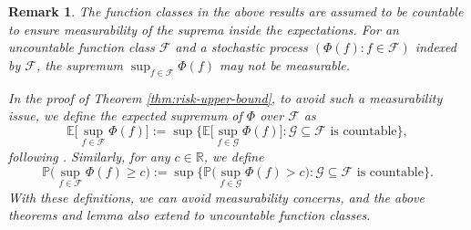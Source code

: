 \documentclass[10pt]{article}
\newtheorem{remark}{Remark}
\newcommand{\E}{{\mathbb E}}
\newcommand{\F}{{\mathcal{F}}}
\newcommand{\G}{{\mathcal{G}}}
\newcommand{\R}{{\mathbb R}}
\renewcommand{\P}{{\mathbb P}}
\begin{document}
\begin{remark}\label{rmk:measurability}
    The function classes in the above results are assumed to be countable 
    to ensure measurability of the suprema inside the expectations. For an 
    uncountable function class $\F$ and a stochastic process 
    $(\Phi(f): f \in \F)$ indexed by $\F$, the supremum 
    $\sup_{f \in \F} \Phi(f)$ may not be measurable.
    
    In the proof of Theorem \ref{thm:risk-upper-bound}, to avoid such a
    measurability issue, we define the expected supremum of 
    $\Phi$ over $\F$ as 
    \begin{equation*}
        \E\Big[\sup_{f \in \F} \Phi(f)\Big] 
        := \sup \Big\{\E\Big[\sup_{f \in \G} \Phi(f)\Big]: 
        \G \subseteq \F \text{ is countable} \Big\},
    \end{equation*}
    following \citet{talagrand2022upper}.
    Similarly, for any $c \in \R$, we define 
    \begin{equation*}
        \P\Big(\sup_{f \in \F} \Phi(f) \ge c\Big) 
        := \sup \Big\{\P\Big(\sup_{f \in \G} \Phi(f) > c\Big): 
        \G \subseteq \F \text{ is countable} \Big\}.
    \end{equation*}
    With these definitions, we can avoid measurability concerns, and 
    the above theorems and lemma also extend to uncountable function classes.
\end{remark}
\end{document}
